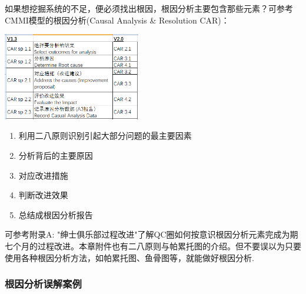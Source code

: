 如果想挖掘系统的不足，便必须找出根因，根因分析主要包含那些元素？可参考CMMI模型的根因分析(Causal
Analysis \& Resolution CAR)：


\includegraphics[width=6cm]{CMMIHM_02.png}

\begin{enumerate}
\tightlist
\item
  利用二八原则识别引起大部分问题的最主要因素
\item
  分析背后的主要原因
\item
  对应改进措施
\item
  判断改进效果
\item
  总结成根因分析报告
\end{enumerate}

可参考附录A:
"绅士俱乐部过程改进"了解QC圈如何按意识根因分析元素完成为期七个月的过程改进。本章附件也有二八原则与帕累托图的介绍。但不要误以为只要使用各种根因分析方法，如帕累托图、鱼骨图等，就能做好根因分析.

\hypertarget{ux6839ux56e0ux5206ux6790ux8befux89e3ux6848ux4f8b}{%
\subsubsection{根因分析误解案例}\label{ux6839ux56e0ux5206ux6790ux8befux89e3ux6848ux4f8b}}


